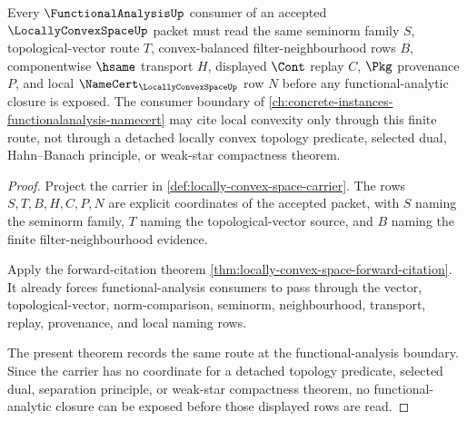\begin{theorem}
\label{thm:locally-convex-space-functional-analysis-anchor}
Every $\FunctionalAnalysisUp$ consumer of an accepted $\LocallyConvexSpaceUp$ packet must read the same seminorm family $S$, topological-vector route $T$, convex-balanced filter-neighbourhood rows $B$, componentwise $\hsame$ transport $H$, displayed $\Cont$ replay $C$, $\Pkg$ provenance $P$, and local $\NameCert_{\LocallyConvexSpaceUp}$ row $N$ before any functional-analytic closure is exposed. The consumer boundary of \autoref{ch:concrete-instances-functionalanalysis-namecert} may cite local convexity only through this finite route, not through a detached locally convex topology predicate, selected dual, Hahn--Banach principle, or weak-star compactness theorem.
\end{theorem}
\begin{proof}
Project the carrier in \autoref{def:locally-convex-space-carrier}. The rows $S,T,B,H,C,P,N$ are explicit coordinates of the accepted packet, with $S$ naming the seminorm family, $T$ naming the topological-vector source, and $B$ naming the finite filter-neighbourhood evidence.

Apply the forward-citation theorem \autoref{thm:locally-convex-space-forward-citation}. It already forces functional-analysis consumers to pass through the vector, topological-vector, norm-comparison, seminorm, neighbourhood, transport, replay, provenance, and local naming rows.

The present theorem records the same route at the functional-analysis boundary. Since the carrier has no coordinate for a detached topology predicate, selected dual, separation principle, or weak-star compactness theorem, no functional-analytic closure can be exposed before those displayed rows are read.
\end{proof}



